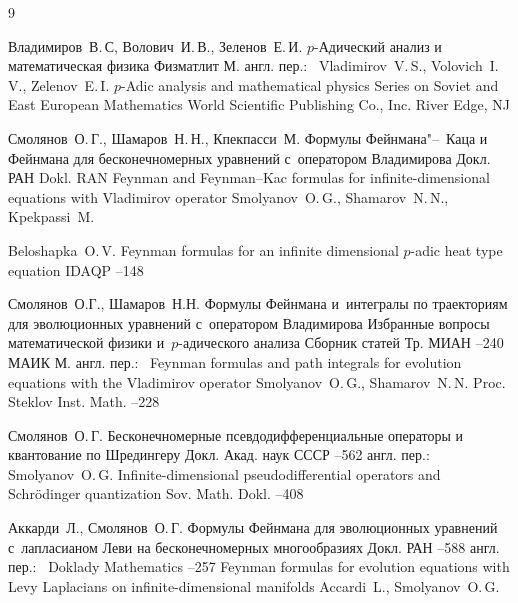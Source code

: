 \begin{thebibliography}{9}


\by Владимиров~В.\,С, Волович~И.\,В., Зеленов~Е.\,И.
\book $p$-Адический анализ и математическая физика
\publ Физматлит
\publaddr М.
\transl
англ. пер.:~
\by Vladimirov~V.\,S., Volovich~I.\,V., Zelenov~E.\,I.
\book $p$-Adic analysis and mathematical physics
\serial Series on Soviet and East European Mathematics
\publ World Scientific Publishing Co., Inc.
\publaddr River Edge, NJ

\by   Смолянов~О.\,Г.,  Шамаров~Н.\,Н.,  Кпекпасси~М.
\paper  Формулы Фейнмана"--~Каца и Фейнмана для бесконечномерных уравнений с~оператором Владимирова
\jour  Докл. РАН
\toappear
\misctransl 
\jour Dokl. RAN
\paper Feynman and Feynman--Kac formulas for infinite-dimensional equations with Vladimirov operator
\by Smolyanov~O.\,G.,  Shamarov~N.\,N., Kpekpassi~M.
\toappear


 \by Beloshapka~O.\,V.
 \paper Feynman formulas for an infinite dimensional $p$-adic heat type equation
 \jour  IDAQP
--148


\by Смолянов~О.Г., Шамаров~Н.Н.
\paper Формулы Фейнмана и~интегралы по траекториям для эволюционных уравнений с~оператором Владимирова
\inbook Избранные вопросы математической физики и~$p$-адического анализа
\bookinfo Сборник статей
\serial Тр. МИАН
--240
\publ МАИК
\publaddr М.
\transl англ. пер.:~
\paper Feynman formulas and path integrals for evolution equations with the Vladimirov operator
\by  Smolyanov~O.\,G.,  Shamarov~N.\,N.
\jour Proc. Steklov Inst. Math.
--228






 
\by   Смолянов~О.\,Г.
\paper  Бесконечномерные псевдодифференциальные операторы и квантование по Шредингеру
\jour  Докл. Акад. наук СССР
--562
\transl англ. пер.:~
\by Smolyanov~O.\,G.
\paper Infinite-dimensional pseudodifferential operators and Schr\"odinger quantization
\jour Sov. Math. Dokl.
--408 


\by Аккарди~Л.,  Смолянов~О.\,Г.
\paper  Формулы Фейнмана для эволюционных уравнений с~лапласианом Леви на бесконечномерных многообразиях
\jour Докл. РАН
--588
 \transl англ. пер.:~
\jour  Doklady Mathematics
--257
\paper Feynman formulas for evolution equations with Levy Laplacians on infinite-dimensional manifolds
\by Accardi~L., Smolyanov~O.\,G.


\end{thebibliography}

